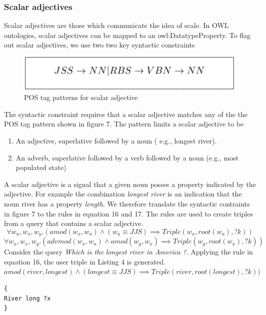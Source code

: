 \documentclass[review]{elsarticle}
\begin{document}
\subsubsection{Scalar adjectives}
Scalar adjectives are those which communicate the  idea of scale. In OWL ontologies, scalar adjectives can be mapped to an owl:DatatypeProperty. To flag out scalar adjectives, we use two two key syntactic constraints
\begin{figure}[H]	\includegraphics[scale=0.5,angle=0]{adjectiveSA.png}
		\caption{POS tag patterns for scalar adjective  }
	\label{fig:example2}
\end{figure}The syntactic constraint requires that a scalar adjective
matches any of the the POS tag pattern shown in figure 7. The pattern limits a scalar adjective to be
\begin{enumerate}
\item An  adjective, superlative followed by a noun ( e.g., longest river).
\item An adverb, superlative followed by a verb followed by a noun (e.g., most populated state)
\end{enumerate}
A scalar adjective is a signal that a given noun posses a  property  indicated by the adjective. For example the combination \textit{longest river} is an indication that the noun river has a property \textit{length}.
We therefore translate the syntactic contraints in figure 7 to  the rules in equation 16 and 17. The rules are used  to create triples from a query that contains a scalar adjective.
\begin{equation}
 \forall  w_u,w_x,w_y.(amod(w_x,w_u)\land (w_u\equiv JJS)\implies Triple(w_x,root(w_u), ?k))
\end{equation}
\begin{equation}
 \forall   w_u,w_x,w_y.(advmod(w_x,w_u)\land amod(w_y,w_x)\implies Triple(w_y,root(w_x), ?k))
\end{equation}
Consider the query \textit{Which is the longest river in America ?}. Applying the rule in equation 16, the  user triple in Listing 4 is generated.\\
$amod(river,longest)\land (longest\equiv JJS)\implies Triple(river,root(longest), ?k))$\\
\begin{lstlisting}[caption= User triples]
{
River long ?x
}
\end{lstlisting}
\end{document}
